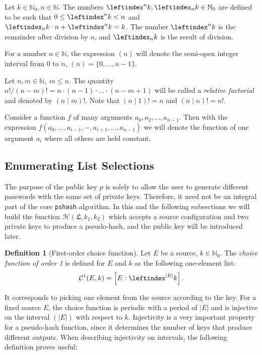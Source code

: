 \documentclass[a4paper, 10pt]{article}
\theoremstyle{plain}
\theoremstyle{definition}
\newtheorem{definition}[theorem]{Definition}
\newcommand{\N}{\mathbb{N}}
\newcommand{\li}{\leftindex}
\newcommand{\rf}[2]{(#1 \mathbin{\mid} #2)!}
\newcommand{\cc}{\mathcal{C}}
\newcommand{\conf}{\mathfrak{L}}
\newcommand{\h}{\mathcal{H}}
\begin{document}
Let $k \in \N_0, n \in \N$. The numbers $\li^n k, \li_n k \in \N_0$ are defined to be such that $0 \leq \li^n k < n$ and $\li_n k \cdot n + \li^n k = k$.  The number $\li^n k$ is the remainder after division by $n$, and $\li_n k$ is the result of division.

For a number $n \in \N$, the expression $(n)$ will denote the semi-open integer interval from $0$ to $n$, $(n) = \{0, ..., n-1\}$.

Let $n,m \in \N,\ m \leq n$. The quantity $n!/(n-m)! = n \cdot (n-1) \cdot \ldots \cdot (n-m+1)$ will be called a \emph{relative factorial} and denoted by $\rf{n}{m}$. Note that $\rf{n}{1} = n$ and $\rf{n}{n} = n!$.

Consider a function $f$ of many arguments $a_0, a_2, ..., a_{n-1}$. Then with the expression $f(a_0, ..., a_{i-1}, -, a_{i+1}, ..., a_{n-1})$ we will denote the function of one argument $a_i$ where all others are held constant.

\subsection{Enumerating List Selections}

The purpose of the public key $p$ is solely to allow the user to generate different passwords with the same set of private keys. Therefore, it need not be an integral part of the core \texttt{pshash} algorithm. In this and the following subsections we will build the function $\h(\conf, k_1, k_2)$ which accepts a source configuration and two private keys to produce a pseudo-hash, and the public key will be introduced later.\\

\begin{definition}[First-order choice function]
  \label{c1ek}
  Let $E$ be a source, $k \in \N_0$. The \emph{choice function of order 1} is defined for $E$ and $k$ as the following one-element list:
  \[
    \cc^1 (E,k) = \left[ E : \li^{|E|}k \right].
  \]
\end{definition}

It corresponds to picking one element from the source according to the key. For a fixed source $E$, the choice function is periodic with a period of $|E|$ and is injective  on the interval $(|E|)$ with respect to $k$. Injectivity is a very important property for a pseudo-hash function, since it determines the number of keys that produce different outputs. When describing injectivity on intervals, the following definition proves useful:\\
\end{document}
